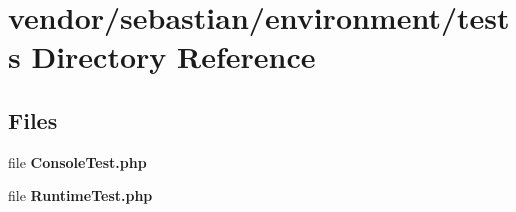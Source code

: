 \section{vendor/sebastian/environment/tests Directory Reference}
\label{dir_85119ad95aeb4fbd9421d626789fb3bf}
\subsection*{Files}
\begin{DoxyCompactItemize}
\item 
file {\bf Console\+Test.\+php}
\item 
file {\bf Runtime\+Test.\+php}
\end{DoxyCompactItemize}
